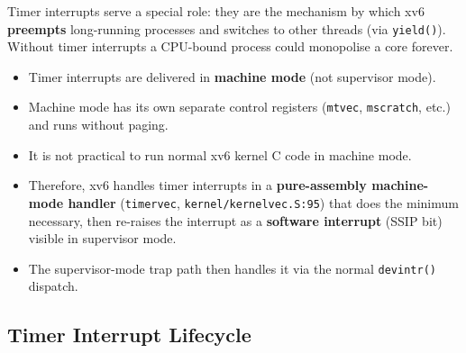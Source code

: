 \documentclass[11pt, a4paper]{article}
\begin{document}
Timer interrupts serve a special role: they are the mechanism by which xv6 \textbf{preempts} long-running processes and switches to other threads (via \lstinline|yield()|). Without timer interrupts a CPU-bound process could monopolise a core forever.

\begin{tcolorbox}[timer, title={Timer Interrupt Peculiarities}]
\begin{itemize}[leftmargin=1.5em, itemsep=0.2em]
  \item Timer interrupts are delivered in \textbf{machine mode} (not supervisor mode).
  \item Machine mode has its own separate control registers (\lstinline|mtvec|, \lstinline|mscratch|, etc.) and runs without paging.
  \item It is not practical to run normal xv6 kernel C code in machine mode.
  \item Therefore, xv6 handles timer interrupts in a \textbf{pure-assembly machine-mode handler} (\lstinline|timervec|, \lstinline|kernel/kernelvec.S:95|) that does the minimum necessary, then re-raises the interrupt as a \textbf{software interrupt} (SSIP bit) visible in supervisor mode.
  \item The supervisor-mode trap path then handles it via the normal \lstinline|devintr()| dispatch.
\end{itemize}
\end{tcolorbox}

\subsection{Timer Interrupt Lifecycle}
\end{document}
